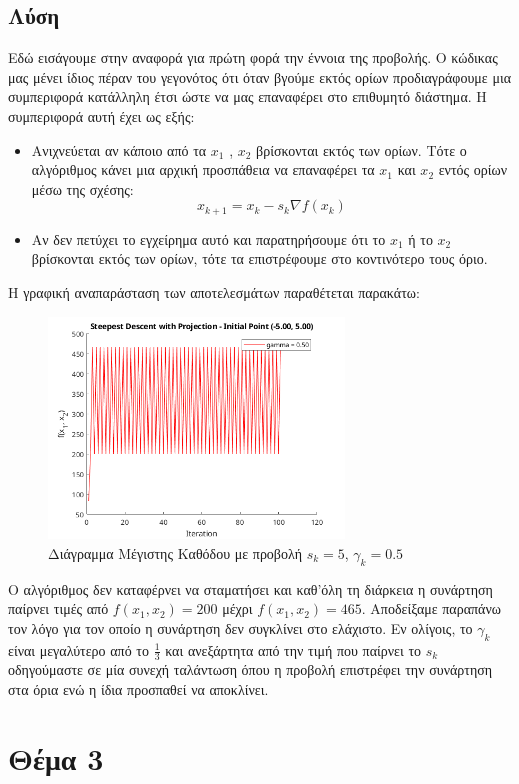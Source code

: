 \documentclass{report}
\begin{document}
\section{Λύση}
Εδώ εισάγουμε στην αναφορά για πρώτη φορά την έννοια της προβολής. Ο κώδικας μας μένει ίδιος
πέραν του γεγονότος ότι όταν βγούμε εκτός ορίων προδιαγράφουμε μια συμπεριφορά κατάλληλη έτσι
ώστε να μας επαναφέρει στο επιθυμητό διάστημα. Η συμπεριφορά αυτή έχει ως εξής:
\begin{itemize}
    \item Ανιχνεύεται αν κάποιο από τα $x_1$ , $x_2$ βρίσκονται εκτός των ορίων. Τότε ο αλγόριθμος
    κάνει μια αρχική προσπάθεια να επαναφέρει τα $x_1$ και $x_2$ εντός ορίων μέσω της σχέσης:
    $$x_{k+1} = x_k - s_k \nabla f(x_k)$$
    \item Αν δεν πετύχει το εγχείρημα αυτό και παρατηρήσουμε ότι το $x_1$ ή το $x_2$ βρίσκονται εκτός
    των ορίων, τότε τα επιστρέφουμε στο κοντινότερο τους όριο.
\end{itemize}
Η γραφική αναπαράσταση των αποτελεσμάτων παραθέτεται παρακάτω:
\begin{figure}[H]
    \centering
    \includegraphics[width=0.7\textwidth]{media/thema2.png}
    \caption{Διάγραμμα Μέγιστης Καθόδου με προβολή $s_k = 5$, $\gamma_k = 0.5$}
\end{figure}
Ο αλγόριθμος δεν καταφέρνει να σταματήσει και καθ'όλη τη διάρκεια η συνάρτηση παίρνει τιμές από 
$f(x_1,x_2) = 200$ μέχρι $f(x_1,x_2) = 465$. Αποδείξαμε παραπάνω τον λόγο για τον οποίο η συνάρτηση
δεν συγκλίνει στο ελάχιστο. Εν ολίγοις, το $\gamma_k$ είναι μεγαλύτερο από το $\frac{1}{3}$ και 
ανεξάρτητα από την τιμή που παίρνει το $s_k$ οδηγούμαστε σε μία συνεχή ταλάντωση όπου η προβολή 
επιστρέφει την συνάρτηση στα όρια ενώ η ίδια προσπαθεί να αποκλίνει.


\chapter{Θέμα 3}
\end{document}
